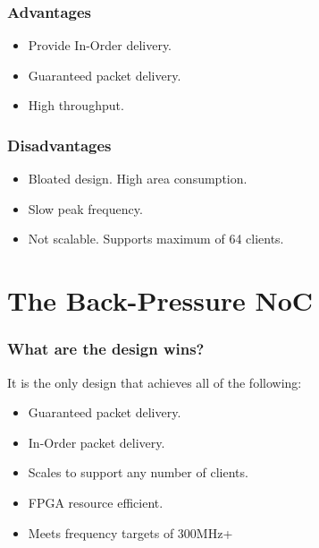 \documentclass{beamer}
\begin{document}
	    \begin{frame}\frametitle{Advantages}
	    \pause
	    \begin{itemize}
	        \item Provide In-Order delivery.
	        \pause
	        \item Guaranteed packet delivery.
	        \pause
	        \item High throughput.
        \end{itemize}
	    \end{frame}
	    
	    \begin{frame}\frametitle{Disadvantages}
	    \pause
	    \begin{itemize}
	        \item Bloated design. High area consumption.
	        \pause
	        \item Slow peak frequency.
	        \pause
	        \item Not scalable. Supports maximum of 64 clients.
        \end{itemize}
	    \end{frame}
	
	\section{The Back-Pressure NoC}
        \begin{frame}
        \frametitle{What are the design wins?}
           \pause
           It is the only design that achieves all of the following:
           \pause
           \begin{itemize}
               \item Guaranteed packet delivery.
               \pause 
               \item In-Order packet delivery.
               \pause
               \item Scales to support any number of clients.
               \pause
               \item FPGA resource efficient.
               \pause
               \item Meets frequency targets of 300MHz+
           \end{itemize}
        \end{frame}
        
\end{document}

